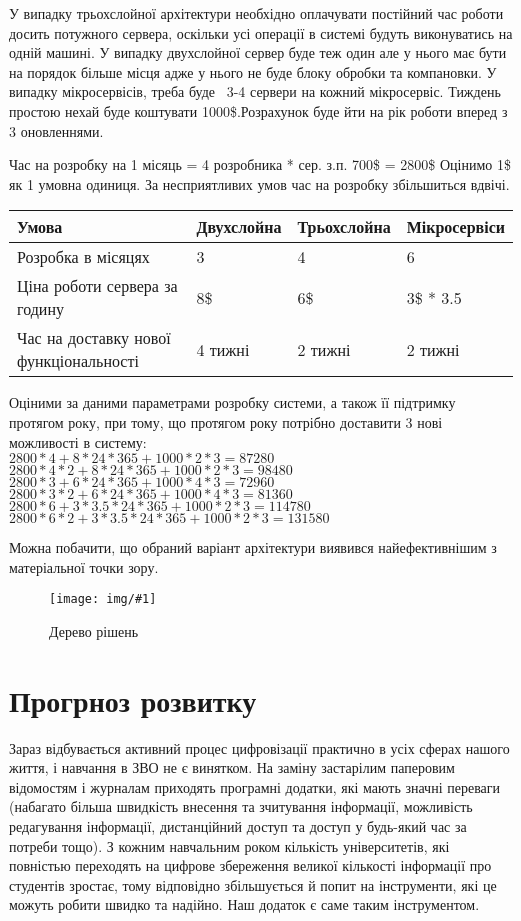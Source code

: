 \documentclass[14pt,a4paper,oneside]{extbook}
\newcommand{\DefaultFigure}[3]{
	\begin{figure}[H]
		\centering
		\texttt{[image: img/\#1]}
		\caption{#2}
		\label{pic:#3}
	\end{figure}
}
\begin{document}
	У випадку трьохслойної архітектури необхідно оплачувати постійний час роботи досить потужного сервера, оскільки усі операції в системі будуть виконуватись на одній машині. У випадку двухслойної сервер буде теж один але у нього має бути на порядок більше місця адже у нього не буде блоку обробки та компановки. У випадку мікросервісів, треба буде ~3-4 сервери на кожний мікросервіс. Тиждень простою нехай буде коштувати 1000\$.Розрахунок буде йти на рік роботи вперед з 3 оновленнями.

	Час на розробку на 1 місяць = 4 розробника * сер. з.п. 700\$ = 2800\$    Оцінимо 1\$ як 1 умовна одиниця. За несприятливих умов час на розробку збільшиться вдвічі.

	\begin{table}[H]
		\centering
		\begin{tabularx}{\textwidth}{ | X | X | X | X | }
			\hline
			Умова & Двухслойна & Трьохслойна & Мікросервіси\\\hline
			Розробка в місяцях & 3 & 4 & 6\\\hline
			Ціна роботи сервера за годину & 8\$ & 6\$ & 3\$ * 3.5\\\hline
			Час	на	доставку нової функціональності & 4 тижні & 2 тижні & 2 тижні\\\hline

		\end{tabularx}
	\end{table}
	Оціними за даними параметрами розробку системи, а також її підтримку протягом року, при тому, що протягом року потрібно доставити 3 нові можливості в систему:\\
	$2800*4+8*24*365+1000*2*3=87280$\\
	$2800*4*2+8*24*365+1000*2*3=98480$\\
	$2800*3+6*24*365+1000*4*3=72960$\\
	$2800*3*2+6*24*365+1000*4*3=81360$\\
	$2800*6+3*3.5*24*365+1000*2*3=114780$\\
	$2800*6*2+3*3.5*24*365+1000*2*3=131580$

	Можна побачити, що обраний варіант архітектури виявився найефективнішим з  матеріальної точки зору.\par
	\DefaultFigure{DecisionTree.png}{Дерево рішень}{DesisionTree}
\chapter{Прогрноз розвитку}
	Зараз відбувається активний процес цифровізації  практично в усіх сферах нашого життя, і навчання в ЗВО не є винятком. На заміну застарілим паперовим відомостям і журналам приходять програмні додатки, які мають значні переваги (набагато більша швидкість внесення та зчитування інформації, можливість редагування інформації, дистанційний доступ та доступ у будь-який час за потреби тощо). З кожним навчальним роком кількість університетів, які повністью переходять на цифрове збереження великої кількості інформації про студентів зростає, тому відповідно збільшується й попит на інструменти, які це можуть робити швидко та надійно. Наш додаток є саме таким інструментом.
\end{document}

